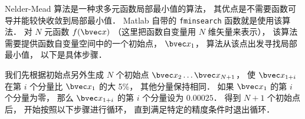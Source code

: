 

Nelder-Mead 算法是一种求多元函数局部最小值的算法， 其优点是不需要函数可导并能较快收敛到局部最小值． Matlab 自带的 \verb|fminsearch| 函数就是使用该算法． 对 $N$ 元函数 $f(\bvec x)$ （这里把函数自变量用 $N$ 维矢量来表示）， 该算法需要提供函数自变量空间中的一个初始点， $\bvec x_1$， 算法从该点出发寻找局部最小值， 以下是具体步骤．

我们先根据初始点另外生成 $N$ 个初始点 $\bvec x_2\dots\bvec x_{N + 1}$， 使 $\bvec x_{1 + i}$ 在第 $i$ 个分量比 $\bvec x_1$ 的大 5\%， 其他分量保持相同． 如果 $\bvec x_1$ 的第 $i$ 个分量为零， 那么 $\bvec x_{1 + i}$ 的第 $i$ 个分量设为 $0.00025$． 得到 $N+1$ 个初始点后， 开始按照以下步骤进行循环， 直到满足特定的精度条件时退出循环．

